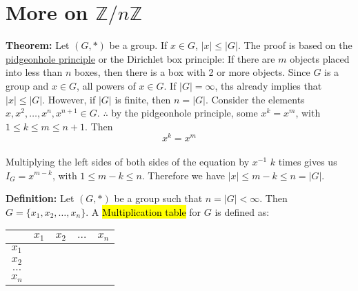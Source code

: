 \documentclass[12pt]{report}
\newcommand{\definitions}[1]{{\leavevmode\color{blue} #1}}
\newcommand{\proof}[1]{{\leavevmode\color{ForestGreen} #1}}
\begin{document}
	\section{More on $\mathbb{Z}/n\mathbb{Z}$}
	\definitions{
	\textbf{Theorem: }Let $(G,*)$ be a group. If $x\in G$, $|x|\leq |G|$.
	}
	\vskip 0.05in
	\proof{
		The proof is based on the \underline{pidgeonhole principle} or the Dirichlet box principle: If there are $m$ objects placed into less than $n$ boxes, then there is a box with 2 or more objects. 
		\vskip 0.05in
		Since $G$ is a group and $x\in G$, all powers of $x\in G$. If $|G|=\infty$, ths already implies that $|x|\leq |G|$. However, if $|G|$ is finite, then $n=|G|$. Consider the elements $x,x^2,\dots,x^n,x^{n+1}\in G$.
		\vskip 0.05in
		$\therefore$ by the pidgeonhole principle, some $x^k=x^m$, with $1\leq k\leq m\leq n+1$. Then 
		$$x^k=x^m$$\\
		Multiplying the left sides of both sides of the equation by $x^{-1}$ $k$ times gives us $I_G=x^{m-k}$, with $1\leq m-k\leq n$. Therefore we have $|x|\leq m-k\leq n=|G|$. 
		}
	\vskip 0.1in
	\definitions{
		\textbf{Definition: }Let $(G,*)$ be a group such that $n=|G|<\infty$. Then $G=\{x_1,x_2,\dots,x_n\}$. A \hl{Multiplication table} for $G$ is defined as: 
		\begin{center}
			\begin{tabular}{|c|c|c|c|c|}
				\hline
				& $x_1$ & $x_2$ & $\dots$ & $x_n$ \\
				\hline
			$x_1$&  &        &         &       \\
			\hline
			$x_2$& & & & \\
			\hline
			$\dots$ & & & & \\
			\hline
			$x_n$ & & & &\\	
			\hline
			\end{tabular}
		\end{center}
	}
	\vskip 0.1in
\end{document}
